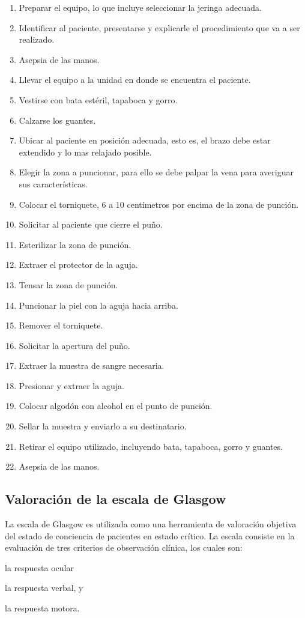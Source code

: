 \begin{enumerate}
\item Preparar el equipo, lo que incluye seleccionar la jeringa adecuada.
\item Identificar al paciente, presentarse y explicarle el procedimiento que va
    a ser realizado.
\item Asepsia de las manos.
\item Llevar el equipo a la unidad en donde se encuentra el paciente.
\item Vestirse con bata estéril, tapaboca y gorro.
\item Calzarse los guantes.
\item Ubicar al paciente en posición adecuada, esto es, el brazo debe estar
    extendido y lo mas relajado posible.
\item Elegir la zona a puncionar, para ello se debe palpar la vena para
    averiguar sus características.
\item Colocar el torniquete, 6 a 10 centímetros por encima de la zona de
    punción.
\item Solicitar al paciente que cierre el puño.
\item Esterilizar la zona de punción.
\item Extraer el protector de la aguja.
\item Tensar la zona de punción.
\item Puncionar la piel con la aguja hacia arriba.
\item Remover el torniquete.
\item Solicitar la apertura del puño.
\item Extraer la muestra de sangre necesaria.
\item Presionar y extraer la aguja.
\item Colocar algodón con alcohol en el punto de punción.
\item Sellar la muestra y enviarlo a su destinatario.
\item Retirar el equipo utilizado, incluyendo bata, tapaboca, gorro y guantes.
\item Asepsia de las manos.
\end{enumerate}


\subsection{Valoración de la escala de Glasgow}
\label{sec:glasgow}

La escala de Glasgow es utilizada como una herramienta de valoración objetiva
del estado de conciencia de pacientes en estado crítico\cite{protocolo}. La
escala consiste en la evaluación de tres criterios de observación clínica,
los cuales son: 
\begin{enumerate*}[label=\itshape\alph*\upshape.]
\item la respuesta ocular
\item la respuesta verbal, y
\item la respuesta motora.
\end{enumerate*}

